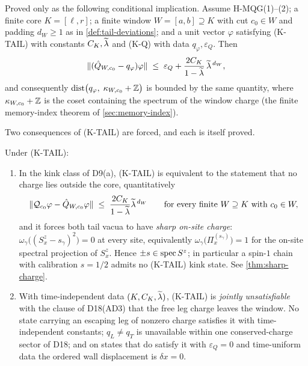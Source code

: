 \begin{theorem}
\label{thm:eps-theorem}
\statusProvedConditional\;
Proved only as the following conditional implication. Assume H-MQG(1)--(2); a
finite core $K=[\ell,r]$; a finite window $W=[a,b]\supseteq K$ with cut
$c_0\in W$ and padding $d_W\ge1$ as in \cref{def:tail-deviations}; and a unit
vector $\varphi$ satisfying (K-TAIL) with constants $C_K,\widetilde{\lambda}$ and (K-Q) with
data $q_\varphi,\varepsilon_Q$. Then
\begin{equation}
  \lVert (\hat{Q}_{W,c_0}-q_\varphi)\varphi\rVert
  \;\le\;\varepsilon_Q+\frac{2C_K}{1-\widetilde{\lambda}}\,\widetilde{\lambda}^{\,d_W},
  \label{eq:eps-bound}
\end{equation}
and consequently $\operatorname{dist}\bigl(q_\varphi,\;\kappa_{W,c_0}+\mathbb{Z}\bigr)$ is bounded by
the same quantity, where $\kappa_{W,c_0}+\mathbb{Z}$ is the coset containing the
spectrum of the window charge (the finite memory-index theorem of
\cref{sec:memory-index}).
\end{theorem}

Two consequences of (K-TAIL) are forced, and each is itself proved.

\begin{corollary}
\label{cor:eps-forced}
\statusProvedConditional\;
Under (K-TAIL):
\begin{enumerate}
\item[(i)] In the kink class of D9(a), (K-TAIL) is equivalent to the statement
that no charge lies outside the core, quantitatively
\begin{equation}
  \lVert \mathcal{Q}_{c_0}\varphi-\hat{Q}_{W,c_0}\varphi\rVert
  \;\le\;\frac{2C_K}{1-\widetilde{\lambda}}\widetilde{\lambda}^{\,d_W}
  \qquad\text{for every finite }W\supseteq K\text{ with }c_0\in W,
  \label{eq:tail-uniform}
\end{equation}
and it forces both tail vacua to have \emph{sharp on-site charge}:
$\omega_\gamma\bigl((S^z_x-s_\gamma)^2\bigr)=0$ at every site, equivalently
$\omega_\gamma\bigl(\Pi_x^{(s_\gamma)}\bigr)=1$ for the on-site spectral
projection of $S^z_x$. Hence $\pm s\in\operatorname{spec} S^z$; in particular a spin-$1$
chain with calibration $s=1/2$ admits no (K-TAIL) kink state. See
\cref{thm:sharp-charge}.
\item[(ii)] With time-independent data $(K,C_K,\widetilde{\lambda})$, (K-TAIL) is
\emph{jointly unsatisfiable} with the clause of D18(AD3) that the free leg
charge leaves the window. No state carrying an escaping leg of nonzero charge
satisfies it with time-independent constants; $q_L\neq q_T$ is unavailable
within one conserved-charge sector of D18; and on states that do satisfy it
with $\varepsilon_Q=0$ and time-uniform data the ordered wall displacement is
$\delta x=0$.
\end{enumerate}
\end{corollary}

